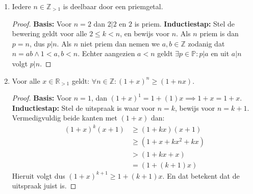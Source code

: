 \documentclass{article}
\begin{document}
\begin{enumerate}[label=\alph*)]
\begin{proof}
            \textbf{Inductiestap:}
            Stel de uitspraak is waar voor $n=k$, en bewijs voor $n=k+1$. Gebruik $3^{2k-1}+2^{k-1}=7p$ voor een zeker $p \in \mathbb{Z}$.    
            \begin{align*}
                3^{2(k+1)+1} + 2^{(k+1)-1} &= 3^2 \cdot 3^{2k+1} + 2 \cdot 2^{k-1} \\
                &= 9 \cdot (7p-2^{k-1}) + 2 \cdot 2^{k-1} \quad (\text{Vervang }3^{2n+1} = 7p-2^{n-1} )\\
                &= 9 \cdot 7p-9 \cdot 2^{k-1} + 2 \cdot 2^{k-1} \\
                &= 9 \cdot 7p+2^{k-1}(-9+2) \\
                &= 7 \cdot 9p+7 \cdot 2^{k-1} \\
                &= 7(9p+2^{k-1})
            \end{align*}
            De uitspraak geldt dus ook voor $n=k+1$ en daarmee is het bewijs voltooid.
        \end{proof}
    \item Iedere $n \in \mathbb{Z}_{>1}$ is deelbaar door een priemgetal.
        \begin{proof}
            \textbf{Basis:} Voor $n=2$ dan $2 | 2$ en $2$ is priem.
            \textbf{Inductiestap:} Stel de bewering geldt voor alle $2 \leq k < n$, en bewijs voor $n$.
            Als $n$ priem is dan $p = n$, dus $p | n$. Als $n$ niet priem dan nemen we $a, b \in \mathbb{Z}$ zodanig dat $n=ab \wedge 1 < a, b < n$.
            Echter aangezien $a < n$ geldt $\exists p \in \mathbb{P} : p | a$ en uit $  a | n$ volgt $p | n$.
        \end{proof}
    \item Voor alle $x \in \mathbb{R}_{>1}$ geldt: $\forall n \in \mathbb{Z}: (1+x)^n \geq (1+nx)$. 
        \begin{proof}
            \textbf{Basis:} Voor $n=1$, dan $(1+x)^1 = 1+(1)x \implies 1 + x = 1+ x$. 
            \textbf{Inductiestap:} Stel de uitspraak is waar voor $n=k$, bewijs voor $n=k+1$.
            Vermedigvuldig beide kanten met $(1+x)$ dan:
                \begin{align*}
                    (1+x)^k(x+1) &\geq (1 + kx)(x+1) \\
                    &\geq (1 + x + kx^2 + kx) \\
                    &> (1+kx +x) \\  
                    &= (1+(k+1)x)
                \end{align*}
                Hieruit volgt dus $(1+x)^{k+1} \geq 1+(k+1)x$. En dat betekent dat de uitspraak juist is.

\end{proof}
\end{enumerate}
\end{document}

